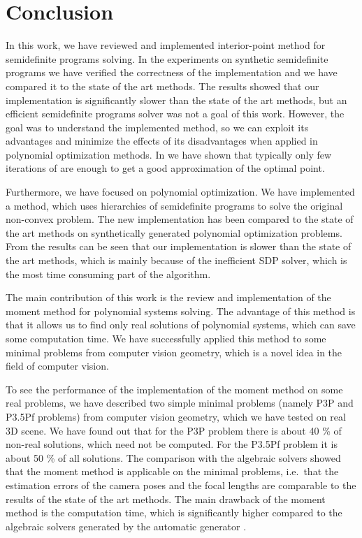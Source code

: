 \chapter{Conclusion}
In this work, we have reviewed and implemented interior-point method for semidefinite programs solving.
In the experiments on synthetic semidefinite programs we have verified the correctness of the implementation and we have compared it to the state of the art methods.
The results showed that our implementation is significantly slower than the state of the art methods, but an efficient semidefinite programs solver was not a goal of this work.
However, the goal was to understand the implemented method, so we can exploit its advantages and minimize the effects of its disadvantages when applied in polynomial optimization methods.
In  we have shown that typically only few iterations of  are enough to get a good approximation of the optimal point.

Furthermore, we have focused on polynomial optimization.
We have implemented a method, which uses hierarchies of semidefinite programs to solve the original non-convex problem.
The new implementation has been compared to the state of the art methods on synthetically generated polynomial optimization problems.
From the results can be seen that our implementation is slower than the state of the art methods, which is mainly because of the inefficient SDP solver, which is the most time consuming part of the algorithm.

The main contribution of this work is the review and implementation of the moment method for polynomial systems solving.
The advantage of this method is that it allows us to find only real solutions of polynomial systems, which can save some computation time.
We have successfully applied this method to some minimal problems from computer vision geometry, which is a novel idea in the field of computer vision.

To see the performance of the implementation of the moment method on some real problems, we have described two simple minimal problems (namely P3P and P3.5Pf problems) from computer vision geometry, which we have tested on real 3D scene.
We have found out that for the P3P problem there is about 40 \% of non-real solutions, which need not be computed.
For the P3.5Pf problem it is about 50 \% of all solutions.
The comparison with the algebraic solvers showed that the moment method is applicable on the minimal problems, i.e.\ that the estimation errors of the camera poses and the focal lengths are comparable to the results of the state of the art methods.
The main drawback of the moment method is the computation time, which is significantly higher compared to the algebraic solvers generated by the automatic generator \cite{autogen}.

